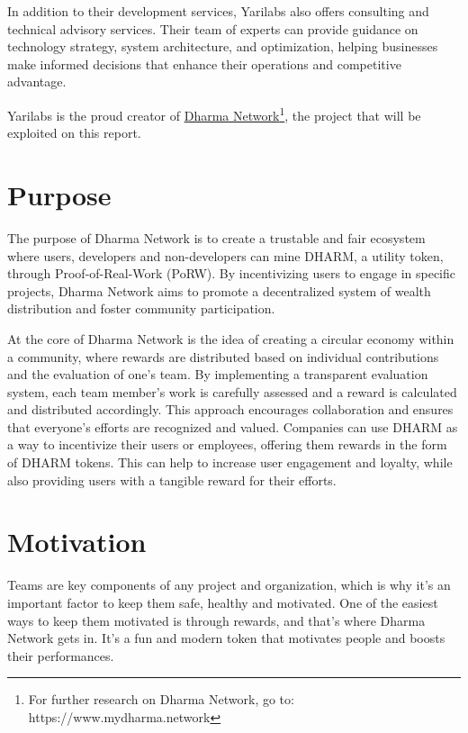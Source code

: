 In addition to their development services, Yarilabs also offers consulting and technical advisory services. Their team of experts can provide guidance on technology strategy, system architecture, and optimization, helping businesses make informed decisions that enhance their operations and competitive advantage.\newline

Yarilabs is the proud creator of \href{https://www.mydharma.network}{Dharma Network}\footnote{For further research on Dharma Network, go to: https://www.mydharma.network}, the project that will be exploited on this report.

\section{Purpose} \label{sec:purpose}

The purpose of Dharma Network is to create a trustable and fair ecosystem where users, developers and non-developers can mine DHARM, a utility token, through Proof-of-Real-Work (PoRW). By incentivizing users to engage in specific projects, Dharma Network aims to promote a decentralized system of wealth distribution and foster community participation.\newline

At the core of Dharma Network is the idea of creating a circular economy within a community, where rewards are distributed based on individual contributions and the evaluation of one's team. By implementing a transparent evaluation system, each team member's work is carefully assessed and a reward is calculated and distributed accordingly. This approach encourages collaboration and ensures that everyone's efforts are recognized and valued. \newline
Companies can use DHARM as a way to incentivize their users or employees, offering them rewards in the form of DHARM tokens. This can help to increase user engagement and loyalty, while also providing users with a tangible reward for their efforts.\newline

\section{Motivation} \label{sec:motivation}

Teams are key components of any project and organization, which is why it's an important factor to keep them safe, healthy and motivated. 
One of the easiest ways to keep them motivated is through rewards, and that's where Dharma Network gets in. It's a fun and modern token that motivates people and boosts their performances.\newline

